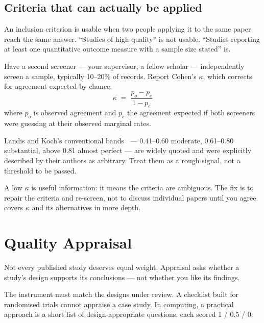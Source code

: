 \subsection{Criteria that can actually be applied}

An inclusion criterion is usable when two people applying it to the same paper
reach the same answer. ``Studies of high quality'' is not usable. ``Studies
reporting at least one quantitative outcome measure with a sample size stated''
is.

\begin{conceptbox}
Have a second screener --- your supervisor, a fellow scholar --- independently
screen a sample, typically 10--20\% of records. Report Cohen's $\kappa$, which
corrects for agreement expected by chance:
\[
\kappa \;=\; \frac{p_o - p_e}{1 - p_e}
\]
where $p_o$ is observed agreement and $p_e$ the agreement expected if both
screeners were guessing at their observed marginal rates.

\medskip
Landis and Koch's conventional bands~\cite{landis1977measurement} --- 0.41--0.60
moderate, 0.61--0.80 substantial, above 0.81 almost perfect --- are widely
quoted and were explicitly described by their authors as arbitrary. Treat them
as a rough signal, not a threshold to be passed.

\medskip
A low $\kappa$ is useful information: it means the criteria are ambiguous. The
fix is to repair the criteria and re-screen, not to discuss individual papers
until you agree.  covers $\kappa$ and its alternatives in
more depth.
\end{conceptbox}

\section{Quality Appraisal}

Not every published study deserves equal weight. Appraisal asks whether a
study's design supports its conclusions --- not whether you like its findings.

The instrument must match the designs under review. A checklist built for
randomised trials cannot appraise a case study. In computing, a practical
approach is a short list of design-appropriate questions, each scored 1 /
0.5 / 0:

